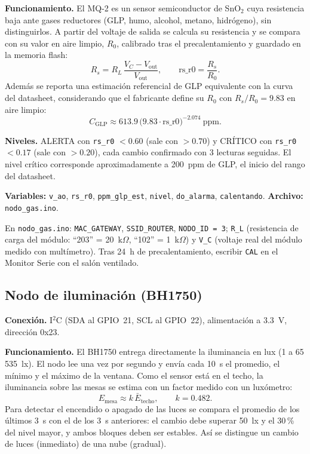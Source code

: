 \documentclass[11pt,a4paper]{article}
\newcommand{\arch}[1]{\texttt{#1}}
\begin{document}
\textbf{Funcionamiento.} El MQ-2 es un sensor semiconductor de SnO$_2$ cuya resistencia baja
ante gases reductores (GLP, humo, alcohol, metano, hidr\'ogeno), sin distinguirlos. A partir
del voltaje de salida se calcula su resistencia y se compara con su valor en aire limpio,
$R_0$, calibrado tras el precalentamiento y guardado en la memoria flash:
\begin{equation}
  R_s = R_L\,\frac{V_C - V_{\text{out}}}{V_{\text{out}}},
  \qquad
  \text{rs\_r0} = \frac{R_s}{R_0}.
\end{equation}
Adem\'as se reporta una estimaci\'on referencial de GLP equivalente con la curva del datasheet,
considerando que el fabricante define su $R_0$ con $R_s/R_0 = 9.83$ en aire limpio:
\begin{equation}
  C_{\text{GLP}} \approx 613.9\,\big(9.83\cdot\text{rs\_r0}\big)^{-2.074}~\text{ppm}.
\end{equation}

\textbf{Niveles.} ALERTA con \texttt{rs\_r0} $< 0.60$ (sale con $> 0.70$) y CR\'ITICO con
\texttt{rs\_r0} $< 0.17$ (sale con $> 0.20$), cada cambio confirmado con 3 lecturas seguidas.
El nivel cr\'itico corresponde aproximadamente a 200~ppm de GLP, el inicio del rango del datasheet.

\textbf{Variables:} \texttt{v\_ao}, \texttt{rs\_r0}, \texttt{ppm\_glp\_est}, \texttt{nivel},
\texttt{do\_alarma}, \texttt{calentando}. \textbf{Archivo:} \arch{nodo\_gas.ino}.

\begin{completar}
En \arch{nodo\_gas.ino}: \texttt{MAC\_GATEWAY}, \texttt{SSID\_ROUTER}, \texttt{NODO\_ID = 3};
\texttt{R\_L} (resistencia de carga del m\'odulo: ``203'' = 20~k$\Omega$, ``102'' = 1~k$\Omega$) y
\texttt{V\_C} (voltaje real del m\'odulo medido con mult\'imetro). Tras 24~h de precalentamiento,
escribir \texttt{CAL} en el Monitor Serie con el sal\'on ventilado.
\end{completar}

\subsection{Nodo de iluminaci\'on (BH1750)}

\textbf{Conexi\'on.} I$^2$C (SDA al GPIO~21, SCL al GPIO~22), alimentaci\'on a 3.3~V,
direcci\'on 0x23.

\textbf{Funcionamiento.} El BH1750 entrega directamente la iluminancia en lux (1 a 65\,535~lx).
El nodo lee una vez por segundo y env\'ia cada 10~s el promedio, el m\'inimo y el m\'aximo de la
ventana. Como el sensor est\'a en el techo, la iluminancia sobre las mesas se estima con un
factor medido con un lux\'ometro:
\begin{equation}
  E_{\text{mesa}} \approx k\,\bar{E}_{\text{techo}}, \qquad k = 0.482.
\end{equation}
Para detectar el encendido o apagado de las luces se compara el promedio de los \'ultimos 3~s con
el de los 3~s anteriores: el cambio debe superar 50~lx y el 30\,\% del nivel mayor, y ambos bloques
deben ser estables. As\'i se distingue un cambio de luces (inmediato) de una nube (gradual).
\end{document}
